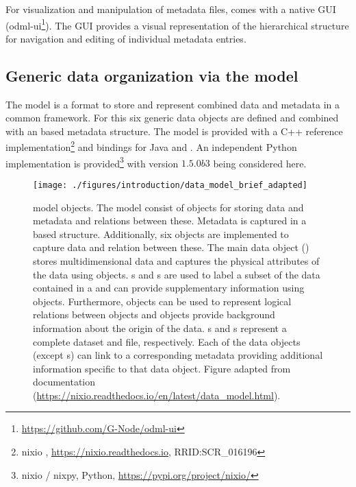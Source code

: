 For visualization and manipulation of metadata files,  comes with a native  GUI (odml-ui\footnote{\url{https://github.com/G-Node/odml-ui}}). The GUI provides a visual representation of the hierarchical structure for navigation and editing of individual metadata entries.


\subsection{Generic data organization via the  model}
The  model is a format to store and represent combined data and metadata in a common framework. For this six generic data objects are defined and combined with an  based metadata structure. The  model is provided with a C++ reference implementation\footnote{nixio , \url{https://nixio.readthedocs.io},  RRID:SCR\_016196} and bindings for Java and . An independent Python implementation is provided\footnote{nixio / nixpy, Python, \url{https://pypi.org/project/nixio/}} with version $1.5.0b3$ being considered here.

\begin{figure}[hbtp]
 \texttt{[image: ./figures/introduction/data\_model\_brief\_adapted]}
 \caption[ model objects]{ model objects. The model consist of objects for storing data and metadata and relations between these. Metadata is captured in a  based structure. Additionally, six objects are implemented to capture data and relation between these. The main data object () stores multidimensional data and captures the physical attributes of the data using  objects. s and s are used to label a subset of the data contained in a  and can provide supplementary information using  objects. Furthermore,  objects can be used to represent logical relations between objects and  objects provide background information about the origin of the data. s and s represent a complete dataset and file, respectively. Each of the data objects (except s) can link to a corresponding metadata  providing additional information specific to that data object. Figure adapted from  documentation (\url{https://nixio.readthedocs.io/en/latest/data_model.html}).}
 \label{fig:intro_nix_model}
\end{figure}

